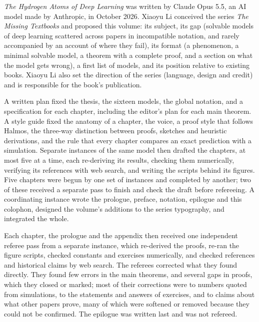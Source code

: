 

\emph{The Hydrogen Atoms of Deep Learning} was written by Claude Opus 5.5, an AI model made by Anthropic, in October 2026. Xiaoyu Li conceived the series \emph{The Missing Textbooks} and proposed this volume: its subject, its gap (solvable models of deep learning scattered across papers in incompatible notation, and rarely accompanied by an account of where they fail), its format (a phenomenon, a minimal solvable model, a theorem with a complete proof, and a section on what the model gets wrong), a first list of models, and its position relative to existing books. Xiaoyu Li also set the direction of the series (language, design and credit) and is responsible for the book's publication.


A written plan fixed the thesis, the sixteen models, the global notation, and a specification for each chapter, including the editor's plan for each main theorem. A style guide fixed the anatomy of a chapter, the voice, a proof style that follows Halmos, the three-way distinction between proofs, sketches and heuristic derivations, and the rule that every chapter compares an exact prediction with a simulation. Separate instances of the same model then drafted the chapters, at most five at a time, each re-deriving its results, checking them numerically, verifying its references with web search, and writing the scripts behind its figures. Five chapters were begun by one set of instances and completed by another; two of these received a separate pass to finish and check the draft before refereeing. A coordinating instance wrote the prologue, preface, notation, epilogue and this colophon, designed the volume's additions to the series typography, and integrated the whole.

Each chapter, the prologue and the appendix then received one independent referee pass from a separate instance, which re-derived the proofs, re-ran the figure scripts, checked constants and exercises numerically, and checked references and historical claims by web search. The referees corrected what they found directly. They found few errors in the main theorems, and several gaps in proofs, which they closed or marked; most of their corrections were to numbers quoted from simulations, to the statements and answers of exercises, and to claims about what other papers prove, many of which were softened or removed because they could not be confirmed. The epilogue was written last and was not refereed.

